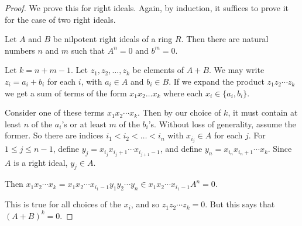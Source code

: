 \documentclass[12pt]{article}
\begin{document}
\begin{proof}
We prove this for right ideals.  Again, by induction, it suffices to prove it for the case of two right ideals.

Let $A$ and $B$ be nilpotent right ideals of a ring $R$.  Then there are natural numbers $n$ and $m$ such that $A^n = 0$ and $b^m = 0$.

Let $k = n + m -1$.  Let $z_1, z_2, \dots, z_k$ be elements of $A + B$.  We may write $z_i = a_i + b_i$ for each $i$, with $a_i \in A$ and $b_i \in B$.  If we expand the product $z_1z_2 \dotsm z_k$ we get a sum of terms of the form
$x_1x_2 \dots x_k$ where each $x_i \in \{ a_i, b_i \}$.

Consider one of these terms $x_1x_2 \dotsm x_k$.  Then by our choice of $k$, it must contain at least $n$ of the $a_i$'s or at least $m$ of the $b_i$'s.  Without loss of generality, assume the former.
So there are indices $i_1 < i_2 < \dots < i_n$ with $x_{i_j} \in A$ for each $j$.
For $1 \le j \le n-1$, define $y_j = x_{i_j} x_{i_j+1} \dotsm x_{i_{j+1}-1}$,
and define $y_n = x_{i_n}x_{i_n+1} \dotsm x_k$.
Since $A$ is a right ideal, $y_j \in A$.

Then $x_1x_2 \dotsm x_k = x_1 x_2 \dotsm x_{i_1-1} y_1 y_2 \dotsm y_n \in x_1 x_2 \dotsm x_{i_1-1} A^n = 0$.

This is true for all choices of the $x_i$, and so $z_1 z_2 \dotsm z_k = 0$.  But this says that $(A+B)^k = 0$.
\end{proof}
\end{document}
